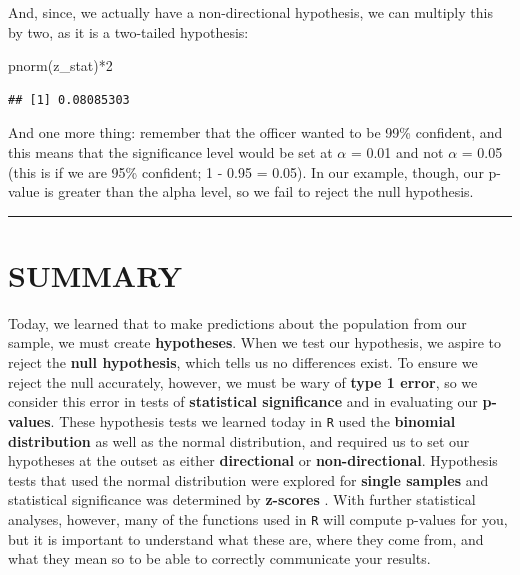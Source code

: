 \documentclass[
]{book}
\newenvironment{Shaded}{\begin{snugshade}}{\end{snugshade}}
\newcommand{\DecValTok}[1]{\textcolor[rgb]{0.00,0.00,0.81}{#1}}
\newcommand{\FunctionTok}[1]{\textcolor[rgb]{0.00,0.00,0.00}{#1}}
\newcommand{\NormalTok}[1]{#1}
\newcommand{\SpecialCharTok}[1]{\textcolor[rgb]{0.00,0.00,0.00}{#1}}
\begin{document}
And, since, we actually have a non-directional hypothesis, we can multiply this by two, as it is a two-tailed hypothesis:

\begin{Shaded}
\begin{Highlighting}[]
\FunctionTok{pnorm}\NormalTok{(z\_stat)}\SpecialCharTok{*}\DecValTok{2}
\end{Highlighting}
\end{Shaded}

\begin{verbatim}
## [1] 0.08085303
\end{verbatim}

And one more thing: remember that the officer wanted to be 99\% confident, and this means that the significance level would be set at \(\alpha\) = 0.01 and not \(\alpha\) = 0.05 (this is if we are 95\% confident; 1 - 0.95 = 0.05). In our example, though, our p-value is greater than the alpha level, so we fail to reject the null hypothesis.

\begin{center}\rule{0.5\linewidth}{0.5pt}\end{center}

\hypertarget{summary-5}{%
\section{SUMMARY}\label{summary-5}}

Today, we learned that to make predictions about the population from our sample, we must create \textbf{hypotheses}. When we test our hypothesis, we aspire to reject the \textbf{null hypothesis}, which tells us no differences exist. To ensure we reject the null accurately, however, we must be wary of \textbf{type 1 error}, so we consider this error in tests of \textbf{statistical significance} and in evaluating our \textbf{p-values}. These hypothesis tests we learned today in \texttt{R} used the \textbf{binomial distribution} as well as the normal distribution, and required us to set our hypotheses at the outset as either \textbf{directional} or \textbf{non-directional}. Hypothesis tests that used the normal distribution were explored for \textbf{single samples} and statistical significance was determined by \textbf{z-scores} . With further statistical analyses, however, many of the functions used in \texttt{R} will compute p-values for you, but it is important to understand what these are, where they come from, and what they mean so to be able to correctly communicate your results.
\end{document}
